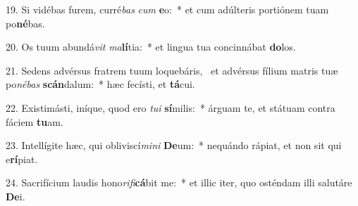 19. Si vidébas furem, curré\textit{bas} \textit{cum} \textbf{e}o:~*  et cum adúlteris portiónem tuam po\textbf{né}bas.\

20. Os tuum abundá\textit{vit} \textit{ma}\textbf{lí}tia:~*  et lingua tua concinnábat \textbf{do}los.\

21. Sedens advérsus fratrem tuum loquebáris, \dag\  et advérsus fílium matris tuæ po\textit{né}\textit{bas} \textbf{scán}dalum:~*  hæc fecísti, et \textbf{tá}cui.\

22. Existimásti, iníque, quod ero \textit{tu}\textit{i} \textbf{sí}milis:~*  árguam te, et státuam contra fáciem \textbf{tu}am.\

23. Intellígite hæc, qui obliviscí\textit{mi}\textit{ni} \textbf{De}um:~*  nequándo rápiat, et non sit qui e\textbf{rí}piat.\

24. Sacrifícium laudis hono\textit{ri}\textit{fi}\textbf{cá}bit me:~*  et illic iter, quo osténdam illi salutáre \textbf{De}i.\

